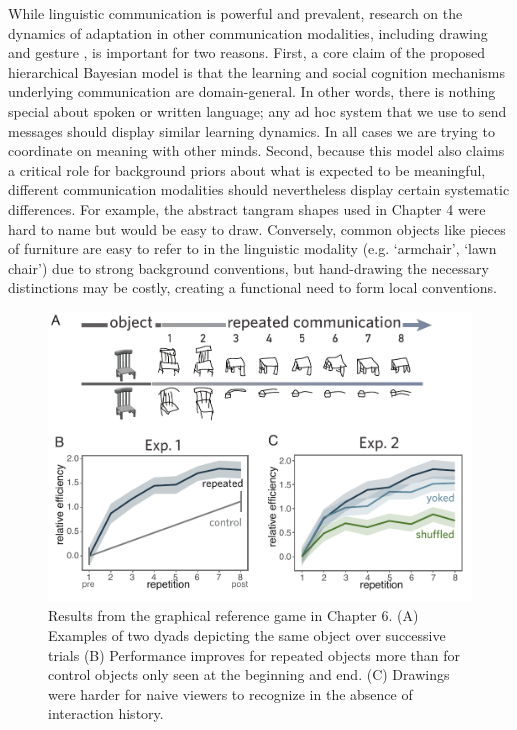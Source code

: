 \documentclass[11pt]{article}
\begin{document}
While linguistic communication is powerful and prevalent, research on the dynamics of adaptation in other communication modalities, including drawing \cite{GarrodFayLeeOberlanderMacLeod07_GraphicalSymbolSystems,Galantucci05_EmergenceOfCommunication,HealeySwobodaUmataKing07_GraphicalLanguageGames,TheisenEtAl10_SystematicityArbitrariness,FayGarrodRobertsSwoboda10_InteractiveEvolution} and gesture  \cite{goldin1996silence,goldin-meadow_role_1999}, is important for two reasons.
First, a core claim of the proposed hierarchical Bayesian model is that the learning and social cognition mechanisms underlying communication are domain-general.
In other words, there is nothing special about spoken or written language; any ad hoc system that we use to send messages should display similar learning dynamics.
In all cases we are trying to coordinate on meaning with other minds. 
Second, because this model also claims a critical role for background priors about what is expected to be meaningful, different communication modalities should nevertheless display certain systematic differences.
For example, the abstract tangram shapes used in Chapter 4 were hard to name but would be easy to draw.
Conversely, common objects like pieces of furniture are easy to refer to in the linguistic modality (e.g. `armchair', `lawn chair') due to strong background conventions, but hand-drawing the necessary distinctions may be costly, creating a functional need to form local conventions. 

\begin{figure}[t!]
\centering
\includegraphics[scale=0.8]{chapter6}
\caption{\small Results from the graphical reference game in Chapter 6. (A) Examples of two dyads depicting the same object over successive trials (B) Performance improves for repeated objects more than for control objects only seen at the beginning and end. (C) Drawings were harder for naive viewers to recognize in the absence of interaction history.}
\label{fig:chapter6}
\end{figure}
\end{document}
